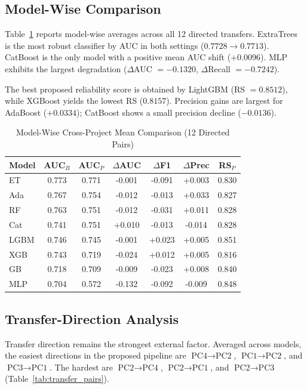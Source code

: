 \documentclass[conference]{IEEEtran}
\begin{document}
\subsection{Model-Wise Comparison}
Table~\ref{tab:modelwise_cross} reports model-wise averages across all 12 directed transfers. ExtraTrees is the most robust classifier by AUC in both settings (\(0.7728\rightarrow0.7713\)). CatBoost is the only model with a positive mean AUC shift (\(+0.0096\)). MLP exhibits the largest degradation (\(\Delta\)AUC \(=-0.1320\), \(\Delta\)Recall \(=-0.7242\)).

The best proposed reliability score is obtained by LightGBM (RS \(=0.8512\)), while XGBoost yields the lowest RS (\(0.8157\)). Precision gains are largest for AdaBoost (\(+0.0334\)); CatBoost shows a small precision decline (\(-0.0136\)).

\begin{table}[t]
\caption{Model-Wise Cross-Project Mean Comparison (12 Directed Pairs)}
\label{tab:modelwise_cross}
\centering
\footnotesize
\setlength{\tabcolsep}{3.1pt}
\renewcommand{\arraystretch}{1.08}
\begin{tabular}{|l|c|c|c|c|c|c|}
\hline
\textbf{Model} & \textbf{AUC\(_B\)} & \textbf{AUC\(_P\)} & \(\Delta\)AUC & \(\Delta\)F1 & \(\Delta\)Prec & \textbf{RS\(_P\)} \\
\hline
ET & 0.773 & 0.771 & -0.001 & -0.091 & +0.003 & 0.830 \\
\hline
Ada & 0.767 & 0.754 & -0.012 & -0.013 & +0.033 & 0.827 \\
\hline
RF & 0.763 & 0.751 & -0.012 & -0.031 & +0.011 & 0.828 \\
\hline
Cat & 0.741 & 0.751 & +0.010 & -0.013 & -0.014 & 0.828 \\
\hline
LGBM & 0.746 & 0.745 & -0.001 & +0.023 & +0.005 & 0.851 \\
\hline
XGB & 0.743 & 0.719 & -0.024 & +0.012 & +0.005 & 0.816 \\
\hline
GB & 0.718 & 0.709 & -0.009 & -0.023 & +0.008 & 0.840 \\
\hline
MLP & 0.704 & 0.572 & -0.132 & -0.092 & -0.009 & 0.848 \\
\hline
\end{tabular}
\renewcommand{\arraystretch}{1.0}
\normalsize
\end{table}

\subsection{Transfer-Direction Analysis}
Transfer direction remains the strongest external factor. Averaged across models, the easiest directions in the proposed pipeline are \(\text{PC4}\rightarrow\text{PC2}\), \(\text{PC1}\rightarrow\text{PC2}\), and \(\text{PC3}\rightarrow\text{PC1}\). The hardest are \(\text{PC2}\rightarrow\text{PC4}\), \(\text{PC2}\rightarrow\text{PC1}\), and \(\text{PC2}\rightarrow\text{PC3}\) (Table~\ref{tab:transfer_pairs}).
\end{document}

